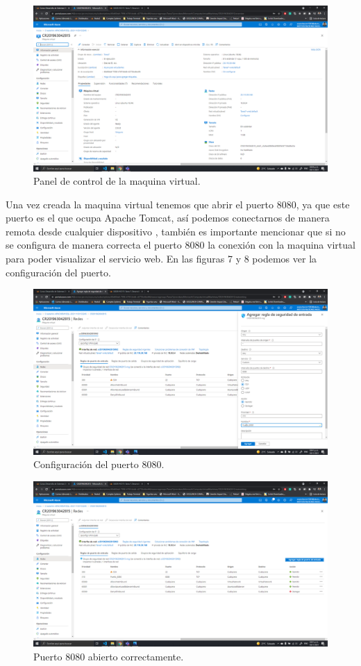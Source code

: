 \documentclass[11pt]{article}
\begin{document}
		\begin{figure}[H]
			\centering
			\includegraphics[scale=0.34]{resources/paneldecontrol.png}
			\caption{Panel de control de la maquina virtual.}\label{fig:picture}
		\end{figure}
		Una vez creada la maquina virtual tenemos que abrir el puerto 8080, ya que este puerto es el que ocupa Apache Tomcat, así podemos conectarnos de manera remota desde cualquier dispositivo , también es importante mencionar que si no se configura de manera correcta el puerto 8080 la conexión con la maquina virtual para poder visualizar el servicio web. En las figuras 7 y 8 podemos ver la configuración del puerto.
		\begin{figure}[H]
			\centering
			\includegraphics[scale=0.34]{resources/open8080.png}
			\caption{Configuración del puerto 8080.}\label{fig:picture}
		\end{figure}
		\begin{figure}[H]
			\centering
			\includegraphics[scale=0.34]{resources/puertook.png}
			\caption{Puerto 8080 abierto correctamente.}\label{fig:picture}
		\end{figure}
\end{document}
